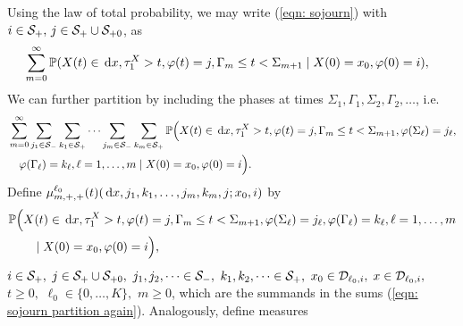 Using the law of total probability, we may write (\ref{eqn: sojourn}) with \(i\in\mathcal{S}_+,\,j\in\mathcal{S}_+\cup\mathcal{S}_{+0}\), as 
\begin{align}
	\label{eqn: sojourn partition}&\sum_{m=0}^\infty \mathbb P(X(t)\in\, \mathrm{d} x, \tau_1^X>t, \varphi(t) = j, \Gamma_m\leq t<\Sigma_{m+1}\mid X(0) = x_0, \varphi(0) = i),
\end{align}
We can further partition by including the phases at times \(\Sigma_1,\Gamma_1, \Sigma_2,\Gamma_2,\dots\), i.e. 
\begin{align}
	&\sum_{m=0}^\infty \sum_{j_1\in\mathcal S_-} \sum_{k_1\in\mathcal S_+}\dots \sum_{j_m\in\mathcal S_-}\sum_{k_m\in\mathcal S_+}  \mathbb P\Big(X(t)\in\, \mathrm{d} x,  \tau_1^X>t, \varphi(t) = j, \Gamma_m\leq t<\Sigma_{m+1}, \nonumber
	\varphi(\Sigma_\ell) = j_\ell ,\\&\quad{}\varphi(\Gamma_\ell) = k_\ell, \ell = 1,\dots,m\mid X(0) = x_0, \varphi(0) = i\Big).\label{eqn: sojourn partition again}
\end{align}
Define \(\mu^{\ell_0}_{m,+,+}(t)(\, \mathrm{d} x, j_1,k_1,\dots,j_m,k_m, j; x_0,i) \) by
\begin{align}
	&\mathbb P\Big(X(t)\in\, \mathrm{d} x, \tau_1^X>t, \varphi(t) = j, \Gamma_m\leq t<\Sigma_{m+1}, \nonumber
	\varphi(\Sigma_\ell) = j_\ell , \varphi(\Gamma_\ell) = k_\ell, \ell = 1,\dots,m \\&\qquad{}\mid X(0) = x_0, \varphi(0) = i\Big),\label{eqn: density part +}
\end{align}
\(i\in\mathcal{S}_+,\) \(j\in\mathcal{S}_+\cup\mathcal{S}_{+0},\) \( j_1,j_2,\dots\in\mathcal{S}_-,\) \(k_1,k_2,\dots\in\mathcal{S}_+,\) \(x_0\in\mathcal{D}_{\ell_0,i},\) \(x\in\mathcal{D}_{\ell_0,i},\) \(t\geq0,\) \(\ell_0\in\{0,\dots,K\},\) \(m\geq 0\), which are the summands in the sums (\ref{eqn: sojourn partition again}). Analogously, define measures 
